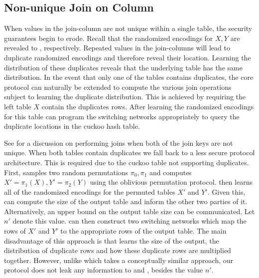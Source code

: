 \subsection{Non-unique Join on Column}
When values in the join-column are not unique within a single table, the security guarantees begin to erode. Recall that the randomized encodings for $X,Y$ are revealed to ,  respectively. Repeated values in the join-columns will lead to duplicate randomized encodings and therefore reveal their location. Learning the distribution of these duplicates reveals that the underlying table has the same distribution. In the event that only one of the tables contains duplicates, the core protocol can naturally be extended to compute the various join operations subject to  learning the duplicate distribution. This is achieved by requiring the left table $X$ contain the duplicates rows. After learning the randomized encodings for this table  can program the switching networks appropriately to query the duplicate locations in the cuckoo hash table. 

\ifccs
See  for a discussion on performing joins when both of the join keys are not unique.
\else
When both tables contain duplicates we fall back to a less secure protocol architecture. This is required due to the cuckoo table not supporting duplicates. First,  samples two random permutations $\pi_0,\pi_1$ and computes $X'=\pi_1(X),Y'=\pi_2(Y)$ using the oblivious permutation protocol.  then learns all of the randomized encodings for the permuted tables $X'$ and $Y'$. Given this,  can compute the size of the output table and inform the other two parties of it. Alternatively, an upper bound on the output table size can be communicated. Let $n'$ denote this value.  can then construct two switching networks which map the rows of $X'$ and $Y'$ to the appropriate rows of the output table. The main disadvantage of this approach is that  learns the size of the output, the distribution of duplicate rows and how these duplicate rows are multiplied together. However, unlike \cite{LTW13} which takes a conceptually similar approach, our protocol does not leak any information to  and , besides the value $n'$.

\fi

